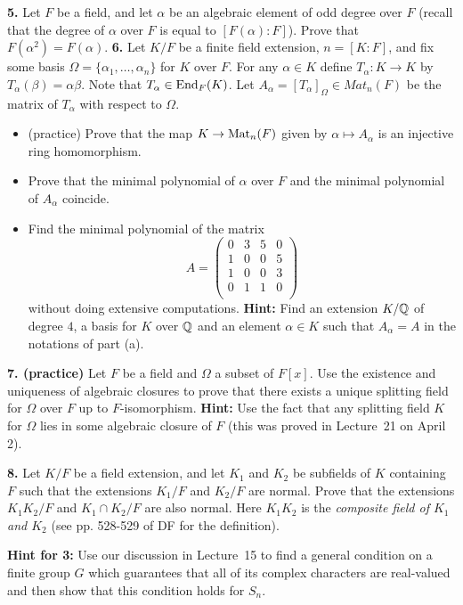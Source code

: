 \documentclass[11pt]{amsart}
\begin{document}
{\bf 5.} \rm Let $F$ be a field, and let $\alpha$ be an algebraic element of odd degree
over $F$ (recall that the degree of $\alpha$ over $F$ is equal to $[F(\alpha):F]$). Prove that
$F(\alpha^2)=F(\alpha)$.
\skv
\skv
{\bf 6.} Let $K/F$ be a finite field extension, $n=[K:F]$, and fix some basis
$\Omega=\{\alpha_1,\ldots, \alpha_n\}$
for $K$ over $F$. For any $\alpha\in K$
define $T_{\alpha}:K\to K$ by $T_{\alpha}(\beta)=\alpha\beta$. Note that $T_{\alpha}\in  {\rm End}_F(K)$.
Let $A_{\alpha}=[T_{\alpha}]_{\Omega}\in Mat_n(F)$ be the matrix of $T_{\alpha}$ with respect to $\Omega$.
\begin{itemize}


\item[(a)] (practice) Prove that the map $K\to {\rm Mat}_n(F)$ given by $\alpha\mapsto A_{\alpha}$ is an injective ring homomorphism.
\item[(b)] Prove that the minimal polynomial of $\alpha$ over $F$ and the minimal polynomial of $A_{\alpha}$
coincide.

\item[(c)] Find the minimal polynomial of the matrix
$$A=\begin{pmatrix}  0&3& 5&0\\
1&0& 0&5\\
1&0& 0&3\\
0&1& 1&0\\
\end{pmatrix}$$
without doing extensive computations.
{\bf Hint:} Find an extension $K/{\mathbb Q}$ of degree $4$, a basis for $K$ over ${\mathbb Q}$
and an element $\alpha\in K$ such that $A_{\alpha}=A$ in the notations of part (a).
\end{itemize}

\skv
{\bf 7. (practice)} \rm Let $F$ be a field and $\Omega$ a subset of $F[x]$.
Use the existence and uniqueness of algebraic closures to prove that
there exists a unique splitting field for $\Omega$ over $F$ up to
$F$-isomorphism. {\bf Hint:} Use the fact that any splitting field 
$K$ for $\Omega$ lies in some algebraic closure of $F$ (this was proved in Lecture~21 on April 2).
\skv

{\bf 8.} Let $K/F$ be a field extension, and let $K_1$ and $K_2$
be subfields of $K$ containing $F$ such that the extensions
$K_1/F$ and $K_2/F$ are normal. Prove that the extensions
$K_1 K_2/F$ and $K_1\cap K_2/F$ are also normal.
Here $K_1 K_2$ is the {\it composite field of $K_1$ and $K_2$} (see  pp. 528-529 of DF for the definition).
\skv

\newpage
{\bf Hint for 3:} Use our discussion in Lecture~15 to find a general condition on a finite group $G$ which guarantees that all of its complex characters are real-valued and then show that this condition holds for $S_n$.
\end{document}
